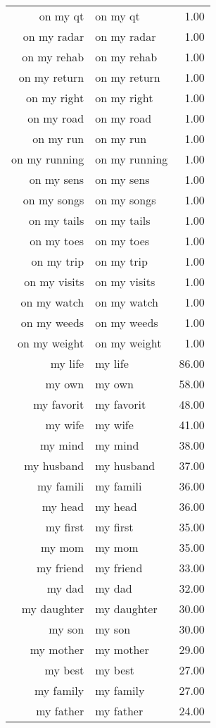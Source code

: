 \begin{table}[ht]
\begin{tabular}{rlr}
  on my qt & on my qt & 1.00 \\ 
  on my radar & on my radar & 1.00 \\ 
  on my rehab & on my rehab & 1.00 \\ 
  on my return & on my return & 1.00 \\ 
  on my right & on my right & 1.00 \\ 
  on my road & on my road & 1.00 \\ 
  on my run & on my run & 1.00 \\ 
  on my running & on my running & 1.00 \\ 
  on my sens & on my sens & 1.00 \\ 
  on my songs & on my songs & 1.00 \\ 
  on my tails & on my tails & 1.00 \\ 
  on my toes & on my toes & 1.00 \\ 
  on my trip & on my trip & 1.00 \\ 
  on my visits & on my visits & 1.00 \\ 
  on my watch & on my watch & 1.00 \\ 
  on my weeds & on my weeds & 1.00 \\ 
  on my weight & on my weight & 1.00 \\ 
  my life & my life & 86.00 \\ 
  my own & my own & 58.00 \\ 
  my favorit & my favorit & 48.00 \\ 
  my wife & my wife & 41.00 \\ 
  my mind & my mind & 38.00 \\ 
  my husband & my husband & 37.00 \\ 
  my famili & my famili & 36.00 \\ 
  my head & my head & 36.00 \\ 
  my first & my first & 35.00 \\ 
  my mom & my mom & 35.00 \\ 
  my friend & my friend & 33.00 \\ 
  my dad & my dad & 32.00 \\ 
  my daughter & my daughter & 30.00 \\ 
  my son & my son & 30.00 \\ 
  my mother & my mother & 29.00 \\ 
  my best & my best & 27.00 \\ 
  my family & my family & 27.00 \\ 
  my father & my father & 24.00 \\ 

\end{tabular}
\end{table}
